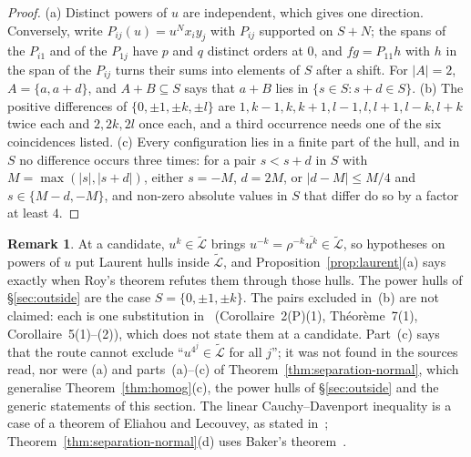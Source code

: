 \documentclass[11pt,a4paper]{article}
\theoremstyle{plain}
\theoremstyle{definition}
\newtheorem{remark}[theorem]{Remark}
\newcommand{\aLogs}{\widetilde{\mathcal{L}}}
\begin{document}
\begin{proof}
(a) Distinct powers of $u$ are independent, which gives one direction. Conversely, write
$P_{ij}(u)=u^{N}x_{i}y_{j}$ with $P_{ij}$ supported on $S+N$; the spans of the $P_{i1}$ and of the $P_{1j}$
have $p$ and $q$ distinct orders at $0$, and $fg=P_{11}h$ with $h$ in the span of the $P_{ij}$ turns their sums
into elements of $S$ after a shift. For $|A|=2$, $A=\{a,a+d\}$, and $A+B\subseteq S$ says that $a+B$ lies in
$\{s\in S:s+d\in S\}$. (b) The positive differences of $\{0,\pm1,\pm k,\pm l\}$ are $1,k-1,k,k+1,l-1,l,l+1,l-k,l+k$
twice each and $2,2k,2l$ once each, and a third occurrence needs one of the six coincidences listed. (c) Every
configuration lies in a finite part of the hull, and in $S$ no difference occurs three times: for a pair
$s<s+d$ in $S$ with $M=\max(|s|,|s+d|)$, either $s=-M$, $d=2M$, or $|d-M|\le M/4$ and $s\in\{M-d,-M\}$, and
non-zero absolute values in $S$ that differ do so by a factor at least $4$.
\end{proof}

\begin{remark}\label{rem:r6-credit}
At a candidate, $u^{k}\in\aLogs$ brings $u^{-k}=\rho^{-k}\overline{u^{k}}\in\aLogs$, so hypotheses on powers of $u$
put Laurent hulls inside $\aLogs$, and Proposition~\ref{prop:laurent}(a) says exactly when Roy's theorem refutes
them through those hulls. The power hulls of \S\ref{sec:outside} are the case $S=\{0,\pm1,\pm k\}$. The pairs excluded in~(b)
are not claimed: each is one substitution in~\cite{diaz-2007} (Corollaire~2(P)(1), Th\'eor\`eme~7(1),
Corollaire~5(1)--(2)), which does not state them at a candidate. Part~(c) says that the route cannot exclude
``$u^{4^{j}}\in\aLogs$ for all $j$''; it was not found in the sources read, nor were (a) and parts~(a)--(c) of
Theorem~\ref{thm:separation-normal}, which generalise Theorem~\ref{thm:homog}(c), the power hulls of \S\ref{sec:outside} and the
generic statements of this section. The linear Cauchy--Davenport inequality is a case of a theorem of Eliahou
and Lecouvey, as stated in~\cite[Theorem~2]{bachoc-serra-zemor}; Theorem~\ref{thm:separation-normal}(d) uses
Baker's theorem~\cite{baker-1966}.
\end{remark}
\end{document}

